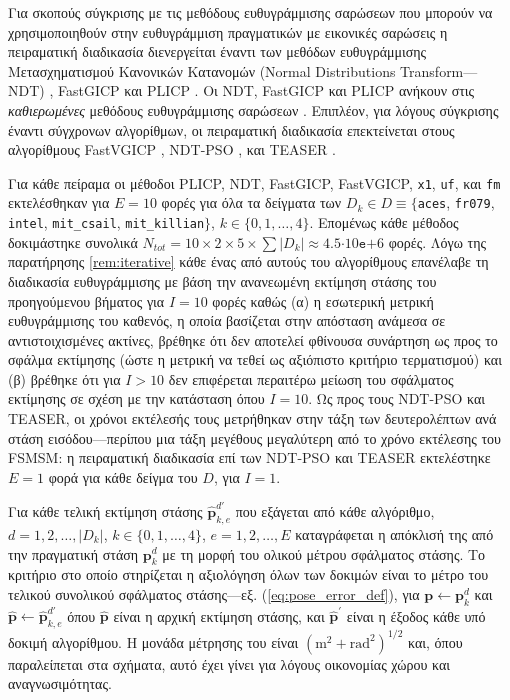 Για σκοπούς σύγκρισης με τις μεθόδους ευθυγράμμισης σαρώσεων που μπορούν να
χρησιμοποιηθούν στην ευθυγράμμιση πραγματικών με εικονικές σαρώσεις η
πειραματική διαδικασία διενεργείται έναντι των μεθόδων ευθυγράμμισης
Μετασχηματισμού Κανονικών Κατανομών (Normal Distributions Transform---NDT)
\cite{Bibera,ndt_code}, FastGICP \cite{Segal2009a,fgicp_code} και PLICP
\cite{Censi2008a,plicp_code}. Οι NDT, FastGICP και PLICP ανήκουν στις
\textit{καθιερωμένες} μεθόδους ευθυγράμμισης σαρώσεων
\cite{Koide2021a,Xu2018b,Sobreira2019b,Pishehvari2019b,Qingshan2019c,Pham2021b}.
Επιπλέον, για λόγους σύγκρισης έναντι σύγχρονων αλγορίθμων, οι πειραματική
διαδικασία επεκτείνεται στους αλγορίθμους FastVGICP
\cite{Koide2021a,fgicp_code}, NDT-PSO \cite{Bouraine2021,ndt_pso_code}, και
TEASER \cite{Yang2021,teaser_code}.

Για κάθε πείραμα οι μέθοδοι PLICP, NDT, FastGICP, FastVGICP, \texttt{x1},
\texttt{uf}, και \texttt{fm} εκτελέσθηκαν για $E = 10$ φορές για όλα τα
δείγματα των $D_k \in D \equiv \{$\texttt{aces}, \texttt{fr079},
\texttt{intel}, \texttt{mit\_csail}, \texttt{mit\_killian}$\}$, $k \in
\{0,1,\dots,4\}$.  Επομένως κάθε μέθοδος δοκιμάστηκε συνολικά $N_{tot} = 10
\times 2 \times 5 \times \sum |D_k|\approx 4.5$$\cdot10$$\texttt{e}$$+$$6$
φορές. Λόγω της παρατήρησης \ref{rem:iterative} κάθε ένας από αυτούς του
αλγορίθμους επανέλαβε τη διαδικασία ευθυγράμμισης με βάση την ανανεωμένη
εκτίμηση στάσης του προηγούμενου βήματος για $I = 10$ φορές καθώς (α) η
εσωτερική μετρική ευθυγράμμισης του καθενός, η οποία βασίζεται στην απόσταση
ανάμεσα σε αντιστοιχισμένες ακτίνες, βρέθηκε ότι δεν αποτελεί φθίνουσα
συνάρτηση ως προς το σφάλμα εκτίμησης (ώστε η μετρική να τεθεί ως αξιόπιστο
κριτήριο τερματισμού) και (β) βρέθηκε ότι για $I > 10$ δεν επιφέρεται περαιτέρω
μείωση του σφάλματος εκτίμησης σε σχέση με την κατάσταση όπου $I=10$.  Ως προς
τους NDT-PSO και TEASER, οι χρόνοι εκτέλεσής τους μετρήθηκαν στην τάξη των
δευτερολέπτων ανά στάση εισόδου---περίπου μια τάξη μεγέθους μεγαλύτερη από το
χρόνο εκτέλεσης του FSMSM: η πειραματική διαδικασία επί των NDT-PSO και TEASER
εκτελέστηκε $E=1$ φορά για κάθε δείγμα του $D$, για $I=1$.

Για κάθε τελική εκτίμηση στάσης $\hat{\bm{p}}_{k,e}^{d\prime}$ που εξάγεται από
κάθε αλγόριθμο, $d = 1,2,\dots,|D_k|$, $k \in \{0,1,\dots,4\}$, $e=1,2,\dots,E$
καταγράφεται η απόκλισή της από την πραγματική στάση $\bm{p}_k^d$ με τη μορφή
του ολικού μέτρου σφάλματος στάσης. Το κριτήριο στο οποίο στηρίζεται η
αξιολόγηση όλων των δοκιμών είναι το μέτρο του τελικού συνολικού σφάλματος
στάσης---εξ. (\ref{eq:pose_error_def}), για $\bm{p} \leftarrow \bm{p}^d_k$ και
$\hat{\bm{p}} \leftarrow \hat{\bm{p}}^{d\prime}_{k,e}$ όπου $\hat{\bm{p}}$
είναι η αρχική εκτίμηση στάσης, και $\hat{\bm{p}}^\prime$ είναι η έξοδος κάθε
υπό δοκιμή αλγορίθμου. Η μονάδα μέτρησης του είναι
$(\text{m}^2+\text{rad}^2)^{1/2}$ και, όπου παραλείπεται στα σχήματα, αυτό έχει
γίνει για λόγους οικονομίας χώρου και αναγνωσιμότητας.

